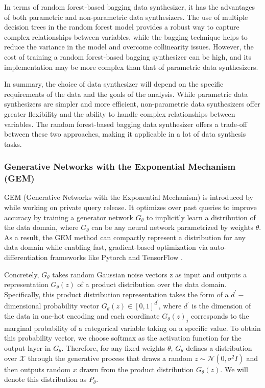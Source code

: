 In terms of random forest-based bagging data synthesizer, it has the advantages of both parametric and non-parametric data synthesizers. The use of multiple decision trees in the random forest model provides a robust way to capture complex relationships between variables, while the bagging technique helps to reduce the variance in the model and overcome collinearity issues. However, the cost of training a random forest-based bagging synthesizer can be high, and its implementation may be more complex than that of parametric data synthesizers.

In summary, the choice of data synthesizer will depend on the specific requirements of the data and the goals of the analysis. While parametric data synthesizers are simpler and more efficient, non-parametric data synthesizers offer greater flexibility and the ability to handle complex relationships between variables. The random forest-based bagging data synthesizer offers a trade-off between these two approaches, making it applicable in a lot of data synthesis tasks.

\subsubsection{Generative Networks with the Exponential Mechanism (GEM)}
\label{subsubsec:terrance}
GEM (Generative Networks with the Exponential Mechanism) is introduced by \citet{liu2021iterative} while working on private query release. It optimizes over past queries to improve accuracy by training a generator network $G_{\theta}$ to implicitly learn a distribution of the data domain, where $G_{\theta}$ can be any neural network parametrized by weights $\theta$. As a result, the GEM method can compactly represent a distribution for any data domain while enabling fast, gradient-based optimization via auto-differentiation frameworks like Pytorch and TensorFlow \citep{paszke2019pytorch,abadi2016tensorflow}.

Concretely, $G_{\theta}$ takes random Gaussian noise vectors z as input and outputs a representation $G_{\theta}(z)$ of a product distribution over the data domain. Specifically, this product distribution representation takes the form of a $d^{'}-$dimensional probability vector $G_{\theta}(z) \in [0,1]^{d^{'}}$, where $d^{'}$ is the dimension of the data in one-hot encoding and each coordinate $G_{\theta}(z)_j$ corresponds to the marginal probability of a categorical variable taking on a specific value. To obtain this probability vector, we choose softmax as the activation function for the output layer in $G_{\theta}$. Therefore, for any fixed weights $\theta$, $G_{\theta}$ defines a distribution over $\mathcal{X}$ through the generative process that draws a random $z \sim \mathcal{N}(0, \sigma ^2I)$ and then outputs random $x$ drawn from the product distribution $G_{\theta}(z)$. We will denote this distribution as $P_\theta$.

